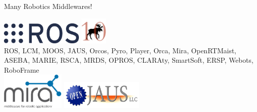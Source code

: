 \documentclass[aspectratio=43]{beamer}
\begin{document}
\begin{frame}{Many Robotics Middlewares!}
\begin{center}
\includegraphics[width=0.3\textwidth]{fig/logo-ros.pdf} \hspace{20pt}
\includegraphics[width=0.1\textwidth]{fig/logo-MOOS.jpg}\\
\vspace{20pt}
ROS, LCM, MOOS, JAUS, Orcos, Pyro, Player, Orca, Mira, OpenRTMaist, ASEBA, MARIE, RSCA, MRDS, OPROS, CLARAty, SmartSoft, ERSP, Webots, RoboFrame
\vspace{20pt}\\
\includegraphics[width=0.23\textwidth]{fig/logo-mira.png} \hspace{20pt}
\includegraphics[width=0.3\textwidth]{fig/logo-openjaus.png}
\end{center}

\end{frame}
 
\end{document}
